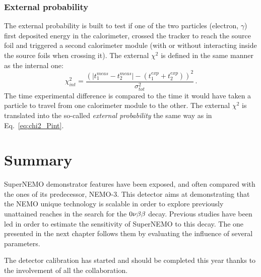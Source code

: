 

\subsubsection{External probability}

The external probability is built to test if one of the two particles (electron, $\gamma$) first deposited energy in the calorimeter, crossed the tracker to reach the source foil and triggered a second calorimeter module (with or without interacting inside the source foils when crossing it).
The external $\chi^{2}$ is defined in the same manner as the internal one:
\begin{equation}
  \chi^{2}_{int}=\frac{(|t^{meas}_{1} - t^{meas}_{2}| - (t^{exp}_{1} + t^{exp}_{2}))^{2}}{\sigma_{tot}^{2}}\,.
  \label{eq:ext_chi2}
\end{equation}
The time experimental difference is compared to the time it would have taken a particle to travel from one calorimeter module to the other.
The external $\chi^{2}$ is translated into the so-called \emph{external probability} the same way as in Eq.~\eqref{eq:chi2_Pint}.

\section{Summary}

SuperNEMO demonstrator features have been exposed, and often compared with the ones of its predecessor, NEMO-$3$.
This detector aims at demonstrating that the NEMO unique technology is scalable in order to explore previously unattained reaches in the search for the $0\nu\beta\beta$ decay.
Previous studies have been led in order to estimate the sensitivity of SuperNEMO to this decay.
The one presented in the next chapter follows them by evaluating the influence of several parameters.

The detector calibration has started and should be completed this year thanks to the involvement of all the collaboration.

